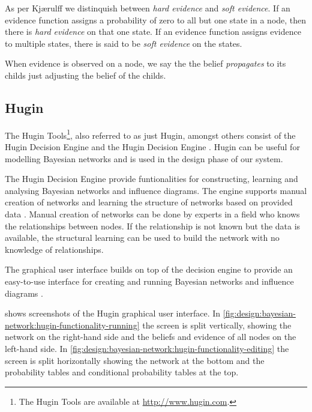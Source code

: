 As per Kjærulff \etal\cite[pp. 23-24]{kjaerulff2008bayesian} we distinquish between \emph{hard evidence} and \emph{soft evidence}. If an evidence function assigns a probability of zero to all but one state in a node, then there is \emph{hard evidence} on that one state. If an evidence function assigns evidence to multiple states, there is said to be \emph{soft evidence} on the states.

When evidence is observed on a node, we say the the belief \emph{propagates} to its childs just adjusting the belief of the childs.

\subsection{Hugin}
\label{sec:analysis:bayesian-network:hugin}

The Hugin Tools\footnote{The Hugin Tools are available at \url{http://www.hugin.com}.}, also referred to as just Hugin, amongst others consist of the Hugin Decision Engine and the Hugin Decision Engine \cite{jensen2005hugin}. Hugin can be useful for modelling Bayesian networks and is used in the design phase of our system.

The Hugin Decision Engine provide funtionalities for constructing, learning and analysing Bayesian networks and influence diagrams. The engine supports manual creation of networks and learning the structure of networks based on provided data \cite{jensen2005hugin}. Manual creation of networks can be done by experts in a field who knows the relationships between nodes. If the relationship is not known but the data is available, the structural learning can be used to build the network with no knowledge of relationships.

The graphical user interface builds on top of the decision engine to provide an easy-to-use interface for creating and running Bayesian networks and influence diagrams \cite{jensen2005hugin}.

 shows screenshots of the Hugin graphical user interface.
In \cref{fig:design:bayesian-network:hugin-functionality-running} the screen is split vertically, showing the network on the right-hand side and the beliefs and evidence of all nodes on the left-hand side. In \cref{fig:design:bayesian-network:hugin-functionality-editing} the screen is split horizontally showing the network at the bottom and the probability tables and conditional probability tables at the top.

